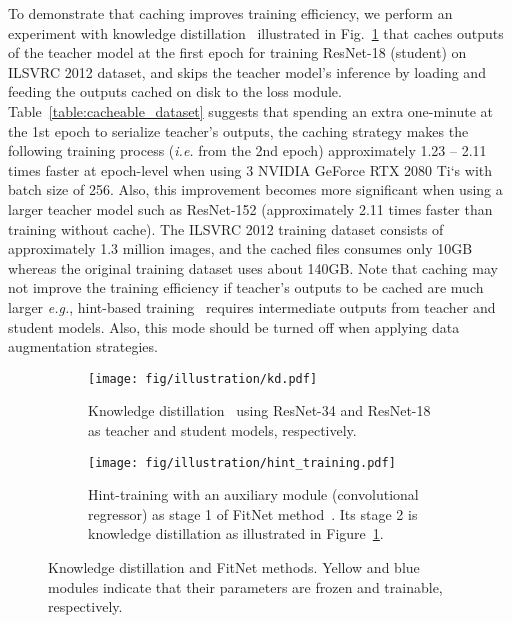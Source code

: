 \documentclass[runningheads]{llncs}
\begin{document}
To demonstrate that caching improves training efficiency, we perform an experiment with knowledge distillation~\cite{hinton14distilling} illustrated in Fig.~\ref{fig:kd} that caches outputs of the teacher model at the first epoch for training ResNet-18 (student) on ILSVRC 2012 dataset, and skips the teacher model's inference by loading and feeding the outputs cached on disk to the loss module.
Table~\ref{table:cacheable_dataset} suggests that spending an extra one-minute at the 1st epoch to serialize teacher's outputs, the caching strategy makes the following training process (\emph{i.e.} from the 2nd epoch) approximately 1.23 -- 2.11 times faster at epoch-level when using 3 NVIDIA GeForce RTX 2080 Ti`s with batch size of 256.
Also, this improvement becomes more significant when using a larger teacher model such as ResNet-152 (approximately 2.11 times faster than training without cache).
The ILSVRC 2012 training dataset consists of approximately 1.3 million images, and the cached files consumes only 10GB whereas the original training dataset uses about 140GB.
Note that caching may not improve the training efficiency if teacher's outputs to be cached are much larger \emph{e.g.}, hint-based training~\cite{romero2015fitnets} requires intermediate outputs from teacher and student models.
Also, this mode should be turned off when applying data augmentation strategies.

\begin{figure}[t]
    \centering
    \begin{subfigure}[b]{0.49\linewidth}
        \centering
        \texttt{[image: fig/illustration/kd.pdf]}
        \caption{Knowledge distillation~\cite{hinton14distilling} using ResNet-34 and ResNet-18 as teacher and student models, respectively.\vspace{1em}}
        \label{fig:kd}
    \end{subfigure}
    \begin{subfigure}[b]{0.49\linewidth}
        \centering 
        \texttt{[image: fig/illustration/hint\_training.pdf]}
        \caption{Hint-training with an auxiliary module (convolutional regressor) as stage 1 of FitNet method~\cite{romero2015fitnets}. Its stage 2 is knowledge distillation as illustrated in Figure~\ref{fig:kd}.}
    \end{subfigure}
    \vspace{-1em}
    \caption{Knowledge distillation and FitNet methods. Yellow and blue modules indicate that their parameters are frozen and trainable, respectively.}
    \label{fig:hint_training}
\end{figure}
\end{document}
